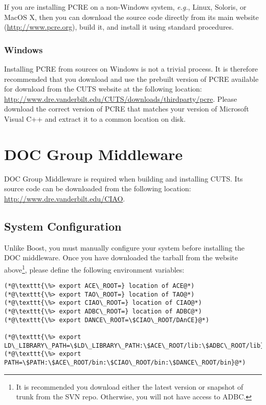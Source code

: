 If you are installing PCRE on a non-Windows system, \textit{e.g.}, Linux, 
Soloris, or MacOS X, then you can download the source code directly from its
main website (\url{http://www.pcre.org}), build it, and install it using
standard procedures.

\subsubsection{Windows}

Installing PCRE from sources on Windows is not a trivial process. 
It is therefore recommended that you download and use the prebuilt 
version of PCRE available for download from the CUTS website at the 
following location:
\url{http://www.dre.vanderbilt.edu/CUTS/downloads/thirdparty/pcre}. Please download
the correct version of PCRE that matches your version of Microsoft Visual
C++ and extract it to a common location on disk.

\section{DOC Group Middleware}
\label{sec:thirdparty-acetaociao}

DOC Group Middleware is required when building and installing CUTS. Its
source code can be downloaded from the following location: 
\url{http://www.dre.vanderbilt.edu/CIAO}.

\subsection{System Configuration}

Unlike Boost, you must manually configure your system before installing
the DOC middleware. Once you have downloaded the tarball from the website 
above\footnote{It is recommended you download either the latest version
or snapshot of trunk from the SVN repo. Otherwise, you will not have access
to ADBC.}, please define the following 
environment variables:
\begin{lstlisting}
(*@\texttt{\%> export ACE\_ROOT=} location of ACE@*)
(*@\texttt{\%> export TAO\_ROOT=} location of TAO@*)
(*@\texttt{\%> export CIAO\_ROOT=} location of CIAO@*)
(*@\texttt{\%> export ADBC\_ROOT=} location of ADBC@*)
(*@\texttt{\%> export DANCE\_ROOT=\$CIAO\_ROOT/DAnCE}@*)

(*@\texttt{\%> export LD\_LIBRARY\_PATH=\$LD\_LIBRARY\_PATH:\$ACE\_ROOT/lib:\$ADBC\_ROOT/lib}@*)
(*@\texttt{\%> export PATH=\$PATH:\$ACE\_ROOT/bin:\$CIAO\_ROOT/bin:\$DANCE\_ROOT/bin}@*)
\end{lstlisting}

